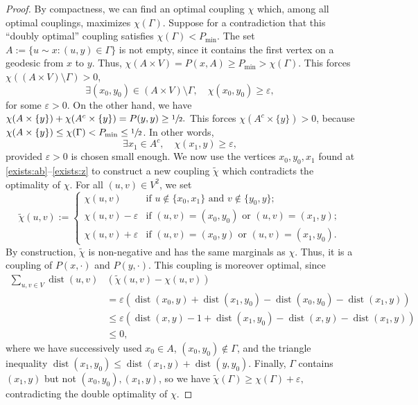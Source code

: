 \documentclass[10pt]{amsart}
\theoremstyle{definition}
\newcommand{\pmin}{P_{\mathrm{min}}}
\DeclareMathOperator{\dist}{dist}
\begin{document}
\begin{proof}
By compactness, we can find an optimal coupling $\chi$ which, among all optimal couplings, maximizes $\chi(\Gamma)$. Suppose for a contradiction that this ``doubly optimal'' coupling satisfies $\chi\left(\Gamma\right)< \pmin$. The set ${A}:=\{u\sim x\colon (u,y)\in \Gamma\}$ is not empty, since it contains the first vertex on a geodesic from $x$ to $y$. Thus,
$\chi(A\times V) = P(x,A) \ge \pmin>\chi(\Gamma)$.
This forces $\chi((A\times V)\setminus\Gamma)>0$, \ie
\begin{equation}
\label{exists:ab}\exists (x_0,y_0)\in (A\times V)\setminus\Gamma,\quad \chi(x_0,y_0) \ge \varepsilon,
\end{equation}
for some $\varepsilon>0$. On the other hand, we have
$
\chi(A\times\{y\}) + \chi(A^c\times\{y\}) = P(y,y)\ge\sfrac{1}{2}.
$
This forces $\chi(A^c\times\{y\}) > 0$, because $\chi(A\times\{y\})\le \chi(\Gamma)<\pmin\le \sfrac{1}{2}$. In other words,
\begin{equation}
\label{exists:z}
\exists x_1\in A^c,\quad \chi(x_1,y) \ge \varepsilon,
\end{equation}
provided $\varepsilon>0$ is chosen small enough. We now use the vertices $x_0,y_0,x_1$ found at \eqref{exists:ab}--\eqref{exists:z} to construct a new coupling $\widetilde{\chi}$ which contradicts the optimality of $\chi$. For all $(u,v)\in V^2$, we set
\begin{equation*}
\widetilde{\chi}(u,v) := 
\begin{cases}
\chi(u,v) & \textrm{if }u\notin\{x_0,x_1\}\textrm{ and }v\notin\{y_0,y\};\\
\chi(u,v)-\varepsilon &\textrm{if }(u,v)=(x_0,y_0)\textrm{ or }(u,v)=(x_1,y);\\
\chi(u,v)+\varepsilon & \textrm{if }(u,v)=(x_0,y)\textrm{ or }(u,v)=(x_1,y_0).
\end{cases}
\end{equation*}
By construction, $\widetilde{\chi}$ is non-negative and has the same marginals as $\chi$. Thus, it is a coupling of $P(x,\cdot)$ and $P(y,\cdot)$. This coupling is moreover optimal, since
\begin{align*}
 \sum_{u,v\in V}\dist(u,v)&\left(\widetilde{\chi}(u,v)-\chi(u,v)\right) \\[-8pt] & = \varepsilon\left(\dist(x_0,y)+\dist(x_1,y_0)-\dist(x_0,y_0)-\dist(x_1,y)\right)\\
& \le \varepsilon\left(\dist(x,y)-1+\dist(x_1,y_0)-\dist(x,y)-\dist(x_1,y)\right)\\
& \le 0,
\end{align*}
where we have successively used $x_0\in A$, $(x_0,y_0)\notin\Gamma$, and the triangle inequality $\dist(x_1,y_0)\le \dist(x_1,y)+\dist(y,y_0)$. Finally, $\Gamma$ contains $(x_1,y)$ but not $(x_0,y_0),(x_1,y)$, so we have
$
\widetilde{\chi}(\Gamma) \ge \chi(\Gamma)+\varepsilon,
$
contradicting the double optimality of $\chi$.
\end{proof}
\end{document}
